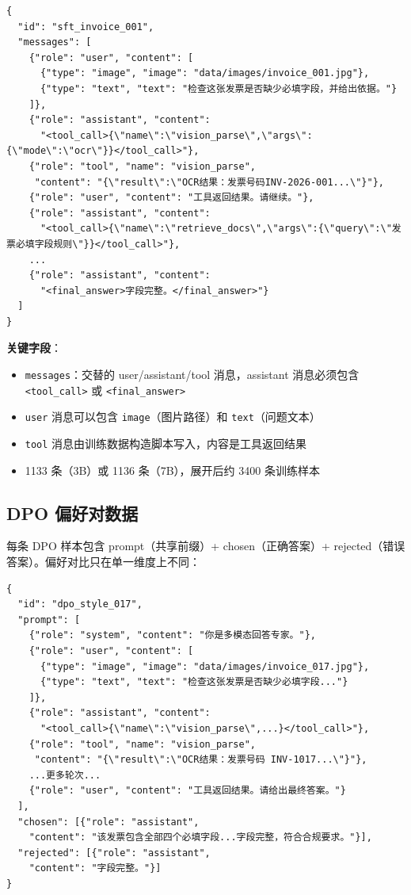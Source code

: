 \documentclass[12pt,a4paper]{ctexart}
\begin{document}
\begin{lstlisting}
{
  "id": "sft_invoice_001",
  "messages": [
    {"role": "user", "content": [
      {"type": "image", "image": "data/images/invoice_001.jpg"},
      {"type": "text", "text": "检查这张发票是否缺少必填字段，并给出依据。"}
    ]},
    {"role": "assistant", "content":
      "<tool_call>{\"name\":\"vision_parse\",\"args\":{\"mode\":\"ocr\"}}</tool_call>"},
    {"role": "tool", "name": "vision_parse",
     "content": "{\"result\":\"OCR结果：发票号码INV-2026-001...\"}"},
    {"role": "user", "content": "工具返回结果。请继续。"},
    {"role": "assistant", "content":
      "<tool_call>{\"name\":\"retrieve_docs\",\"args\":{\"query\":\"发票必填字段规则\"}}</tool_call>"},
    ...
    {"role": "assistant", "content":
      "<final_answer>字段完整。</final_answer>"}
  ]
}
\end{lstlisting}

\textbf{关键字段}：
\begin{itemize}[nosep]
  \item \texttt{messages}：交替的 user/assistant/tool 消息，assistant 消息必须包含 \texttt{<tool\_call>} 或 \texttt{<final\_answer>}
  \item \texttt{user} 消息可以包含 \texttt{image}（图片路径）和 \texttt{text}（问题文本）
  \item \texttt{tool} 消息由训练数据构造脚本写入，内容是工具返回结果
  \item 1133 条（3B）或 1136 条（7B），展开后约 3400 条训练样本
\end{itemize}

\subsection{DPO 偏好对数据}

每条 DPO 样本包含 prompt（共享前缀）+ chosen（正确答案）+ rejected（错误答案）。偏好对比只在单一维度上不同：

\begin{lstlisting}
{
  "id": "dpo_style_017",
  "prompt": [
    {"role": "system", "content": "你是多模态回答专家。"},
    {"role": "user", "content": [
      {"type": "image", "image": "data/images/invoice_017.jpg"},
      {"type": "text", "text": "检查这张发票是否缺少必填字段..."}
    ]},
    {"role": "assistant", "content":
      "<tool_call>{\"name\":\"vision_parse\",...}</tool_call>"},
    {"role": "tool", "name": "vision_parse",
     "content": "{\"result\":\"OCR结果：发票号码 INV-1017...\"}"},
    ...更多轮次...
    {"role": "user", "content": "工具返回结果。请给出最终答案。"}
  ],
  "chosen": [{"role": "assistant",
    "content": "该发票包含全部四个必填字段...字段完整，符合合规要求。"}],
  "rejected": [{"role": "assistant",
    "content": "字段完整。"}]
}
\end{lstlisting}
\end{document}
